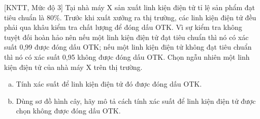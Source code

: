 \begin{bt}%
[KNTT, Mức độ 3]%
	Tại nhà máy X sản xuất linh kiện điện tử tỉ lệ sản phẩm đạt tiêu chuẩn là $80 \%$. Trước khi xuất xưởng ra thị trường, các linh kiện điện tử đều phải qua khâu kiểm tra chất lượng để đóng dấu OTK. Vì sự kiểm tra không tuyệt đối hoàn hảo nên nếu một linh kiện điện tử đạt tiêu chuẩn thì nó có xác suất 0{,}99 được đóng dấu OTK; nếu một linh kiện điện tử không đạt tiêu chuẩn thì nó có xác suất 0{,}95 không được đóng dấu OTK. Chọn ngẫu nhiên một linh kiện điện tử của nhà máy X trên thị trường.
	\begin{enumerate}[a)]
		\item Tính xác suất để linh kiện điện tử đó được đóng dấu OTK.
		\item Dùng sơ đồ hình cây, hãy mô tả cách tính xác suất để linh kiện điện tử được chọn không được đóng dấu OTK.
	\end{enumerate}
	

\end{bt}
